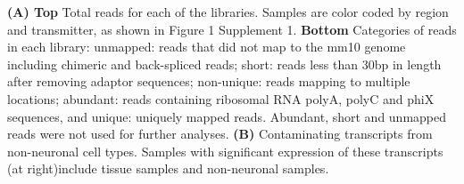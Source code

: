 \textbf{(A) Top} Total reads for each of the libraries. Samples are color coded by region and transmitter, as shown in Figure 1 Supplement 1.
\textbf{Bottom} Categories of reads in each library: unmapped: reads that did not map to the mm10 genome including chimeric and back-spliced reads; short: reads less than 30bp in length after removing adaptor sequences; non-unique: reads mapping to multiple locations; abundant: reads containing ribosomal RNA polyA, polyC and phiX sequences, and unique: uniquely mapped reads. Abundant, short and unmapped reads were not used for further analyses.
\textbf{(B)} Contaminating transcripts from non-neuronal cell types. Samples with significant expression of these transcripts (at right)include tissue samples and non-neuronal samples. 
